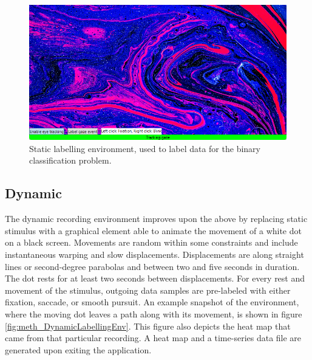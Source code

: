 \begin{figure}[h]
    \centering
    \includegraphics[width=\textwidth]{Images/Labelling/StaticEnvironment2.png}
    \caption{Static labelling environment, used to label data for the binary classification problem.}
    \label{fig:meth_StaticLabellingEnv}
\end{figure}




\subsection{Dynamic}

The dynamic recording environment improves upon the above by replacing static stimulus with a graphical element able to animate the movement of a white dot on a black screen. Movements are random within some constraints and include instantaneous warping and slow displacements. Displacements are along straight lines or second-degree parabolas and between two and five seconds in duration. The dot rests for at least two seconds between displacements. For every rest and movement of the stimulus, outgoing data samples are pre-labeled with either fixation, saccade, or smooth pursuit. An example snapshot of the environment, where the moving dot leaves a path along with its movement, is shown in figure \ref{fig:meth_DynamicLabellingEnv}. This figure also depicts the heat map that came from that particular recording. A heat map and a time-series data file are generated upon exiting the application.

